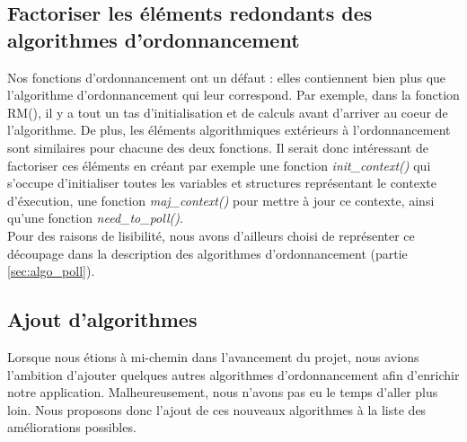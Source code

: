 		\subsection{Factoriser les éléments redondants des algorithmes d'ordonnancement}
			Nos fonctions d'ordonnancement ont un défaut : elles contiennent bien plus que l'algorithme d'ordonnancement qui leur correspond. Par exemple, dans la fonction RM(), il y a tout un tas d'initialisation et de calculs avant d'arriver au coeur de l'algorithme. De plus, les éléments algorithmiques extérieurs à l'ordonnancement sont similaires pour chacune des deux fonctions. Il serait donc intéressant de factoriser ces éléments en créant par exemple une fonction \emph{init\_context()} qui s'occupe d'initialiser toutes les variables et structures représentant le contexte d'éxecution, une fonction \emph{maj\_context()} pour mettre à jour ce contexte, ainsi qu'une fonction \emph{need\_to\_poll()}.\\
			
			Pour des raisons de lisibilité, nous avons d'ailleurs choisi de représenter ce découpage dans la description des algorithmes d'ordonnancement (partie \ref{sec:algo_poll}).
			
		\subsection{Ajout d'algorithmes}
			Lorsque nous étions à mi-chemin dans l'avancement du projet, nous avions l'ambition d'ajouter quelques autres algorithmes d'ordonnancement afin d'enrichir notre application. Malheureusement, nous n'avons pas eu le temps d'aller plus loin. Nous proposons donc l'ajout de ces nouveaux algorithmes à la liste des améliorations possibles.
			

